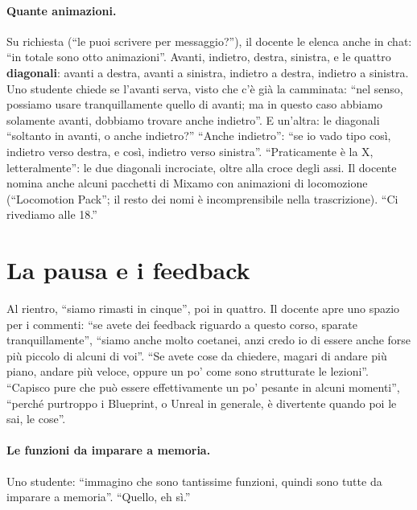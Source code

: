 \paragraph{Quante animazioni.} Su richiesta (``le puoi scrivere per messaggio?''), il
docente le elenca anche in chat: ``in totale sono otto animazioni''. Avanti, indietro,
destra, sinistra, e le quattro \textbf{diagonali}: avanti a destra, avanti a sinistra,
indietro a destra, indietro a sinistra. Uno studente chiede se l'avanti serva, visto che
c'è già la camminata: ``nel senso, possiamo usare tranquillamente quello di avanti; ma in
questo caso abbiamo solamente avanti, dobbiamo trovare anche indietro''. E un'altra: le
diagonali ``soltanto in avanti, o anche indietro?'' ``Anche indietro'': ``se io vado tipo
così, indietro verso destra, e così, indietro verso sinistra''. ``Praticamente è la X,
letteralmente'': le due diagonali incrociate, oltre alla croce degli assi. Il docente
nomina anche alcuni pacchetti di Mixamo con animazioni di locomozione (``Locomotion
Pack''; il resto dei nomi è incomprensibile nella trascrizione). ``Ci rivediamo alle
18.''

\section{La pausa e i feedback}
\label{ue9:sec:feedback}

Al rientro, ``siamo rimasti in cinque'', poi in quattro. Il docente apre uno spazio per
i commenti: ``se avete dei feedback riguardo a questo corso, sparate tranquillamente'',
``siamo anche molto coetanei, anzi credo io di essere anche forse più piccolo di alcuni
di voi''. ``Se avete cose da chiedere, magari di andare più piano, andare più veloce,
oppure un po' come sono strutturate le lezioni''. ``Capisco pure che può essere
effettivamente un po' pesante in alcuni momenti'', ``perché purtroppo i Blueprint, o
Unreal in generale, è divertente quando poi le sai, le cose''.

\paragraph{Le funzioni da imparare a memoria.} Uno studente: ``immagino che sono
tantissime funzioni, quindi sono tutte da imparare a memoria''. ``Quello, eh sì.''

